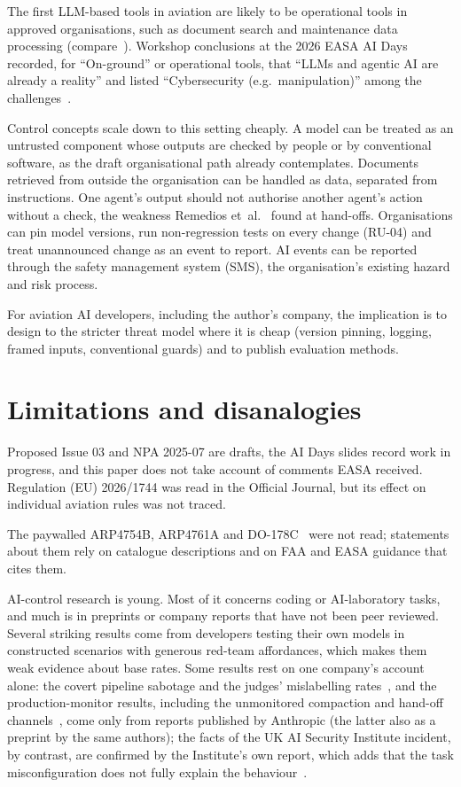 \documentclass[11pt]{article}
\begin{document}
The first LLM-based tools in aviation are likely to be operational tools in approved organisations, such as document search and maintenance data processing (compare~\cite[slide~22]{easa2026aidays}). Workshop conclusions at the 2026 EASA AI Days recorded, for ``On-ground'' or operational tools, that ``LLMs and agentic AI are already a reality'' and listed ``Cybersecurity (e.g.~manipulation)'' among the challenges~\cite[slide~9]{easa2026aidays}.

Control concepts scale down to this setting cheaply. A model can be treated as an untrusted component whose outputs are checked by people or by conventional software, as the draft organisational path already contemplates. Documents retrieved from outside the organisation can be handled as data, separated from instructions. One agent's output should not authorise another agent's action without a check, the weakness Remedios et~al.~\cite{remedios2026redteaming} found at hand-offs. Organisations can pin model versions, run non-regression tests on every change (RU-04) and treat unannounced change as an event to report. AI events can be reported through the safety management system (SMS), the organisation's existing hazard and risk process.

For aviation AI developers, including the author's company, the implication is to design to the stricter threat model where it is cheap (version pinning, logging, framed inputs, conventional guards) and to publish evaluation methods.

\section{Limitations and disanalogies}\label{sec:limitations}

Proposed Issue 03 and NPA 2025-07 are drafts, the AI Days slides record work in progress, and this paper does not take account of comments EASA received. Regulation (EU) 2026/1744 was read in the Official Journal, but its effect on individual aviation rules was not traced.

The paywalled ARP4754B, ARP4761A and DO-178C~\cite{sae2023arp4754b,sae2023arp4761a,rtca2011do178c} were not read; statements about them rely on catalogue descriptions and on FAA and EASA guidance that cites them.

AI-control research is young. Most of it concerns coding or AI-laboratory tasks, and much is in preprints or company reports that have not been peer reviewed. Several striking results come from developers testing their own models in constructed scenarios with generous red-team affordances, which makes them weak evidence about base rates. Some results rest on one company's account alone: the covert pipeline sabotage and the judges' mislabelling rates~\cite{lynch2026agentic}, and the production-monitor results, including the unmonitored compaction and hand-off channels~\cite{remedios2026redteaming}, come only from reports published by Anthropic (the latter also as a preprint by the same authors); the facts of the UK AI Security Institute incident, by contrast, are confirmed by the Institute's own report, which adds that the task misconfiguration does not fully explain the behaviour~\cite{aisi2026incident}.
\end{document}
